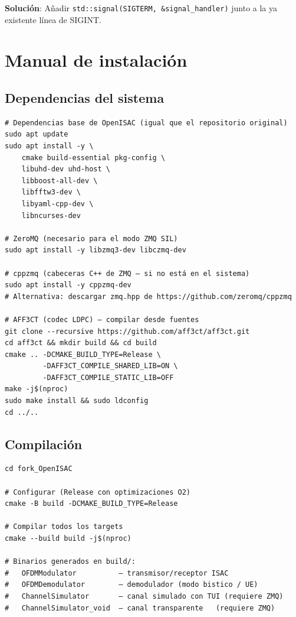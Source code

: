 \documentclass[11pt,a4paper]{article}
\begin{document}
\textbf{Solución}: Añadir \texttt{std::signal(SIGTERM, \&signal\_handler)} junto a
la ya existente línea de SIGINT.

\section{Manual de instalación}

\subsection{Dependencias del sistema}

\begin{lstlisting}[style=bash, caption={Instalación de dependencias en Ubuntu 22.04+}]
# Dependencias base de OpenISAC (igual que el repositorio original)
sudo apt update
sudo apt install -y \
    cmake build-essential pkg-config \
    libuhd-dev uhd-host \
    libboost-all-dev \
    libfftw3-dev \
    libyaml-cpp-dev \
    libncurses-dev

# ZeroMQ (necesario para el modo ZMQ SIL)
sudo apt install -y libzmq3-dev libczmq-dev

# cppzmq (cabeceras C++ de ZMQ — si no está en el sistema)
sudo apt install -y cppzmq-dev
# Alternativa: descargar zmq.hpp de https://github.com/zeromq/cppzmq

# AFF3CT (codec LDPC) — compilar desde fuentes
git clone --recursive https://github.com/aff3ct/aff3ct.git
cd aff3ct && mkdir build && cd build
cmake .. -DCMAKE_BUILD_TYPE=Release \
         -DAFF3CT_COMPILE_SHARED_LIB=ON \
         -DAFF3CT_COMPILE_STATIC_LIB=OFF
make -j$(nproc)
sudo make install && sudo ldconfig
cd ../..
\end{lstlisting}

\subsection{Compilación}

\begin{lstlisting}[style=bash, caption={Compilación del proyecto}]
cd fork_OpenISAC

# Configurar (Release con optimizaciones O2)
cmake -B build -DCMAKE_BUILD_TYPE=Release

# Compilar todos los targets
cmake --build build -j$(nproc)

# Binarios generados en build/:
#   OFDMModulator          — transmisor/receptor ISAC
#   OFDMDemodulator        — demodulador (modo bistico / UE)
#   ChannelSimulator       — canal simulado con TUI (requiere ZMQ)
#   ChannelSimulator_void  — canal transparente   (requiere ZMQ)
\end{lstlisting}
\end{document}
